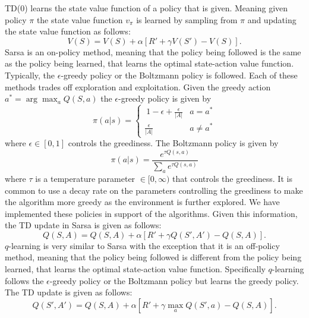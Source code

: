 \documentclass{article}
\begin{document}
TD(0) learns the state value function of a policy that is given. Meaning given policy $\pi$ the state value function $v_\pi$ is learned by sampling from $\pi$ and updating the state value function as follows:
\begin{equation}
V(S) = V(S) + \alpha [R' + \gamma V(S') - V(S)].
\end{equation}
Sarsa is an on-policy method, meaning that the policy being followed is the same as the policy being learned, that learns the optimal state-action value function. Typically, the $\epsilon$-greedy policy or the Boltzmann policy is followed. Each of these methods trades off exploration and exploitation. Given the greedy action $a^* = \arg \max_a Q(S, a)$ the $\epsilon$-greedy policy is given by
\begin{equation} \pi(a|s) =
\begin{cases}
\ 1 - \epsilon + \frac{\epsilon}{|A|} & a = a^* \\
\frac{\epsilon}{|A|} & a \neq a^*
\end{cases}
\end{equation}
where $\epsilon \in [0, 1]$ controls the greediness. The Boltzmann policy is given by
\begin{equation} \pi(a|s) =
\frac{e^{\tau Q(s, a)}}{\sum_a e^{\tau Q(s, a)}} 
\end{equation}
where $\tau$ is a temperature parameter $\in [0, \infty)$ that controls the greediness. It is common to use a decay rate on the parameters controlling the greediness to make the algorithm more greedy as the environment is further explored. We have implemented these policies in support of the algorithms. Given this information, the TD update in Sarsa is given as follows:
\begin{equation}
Q(S, A) = Q(S, A) + \alpha [R' + \gamma Q(S', A') - Q(S, A)].
\end{equation}
$q$-learning is very similar to Sarsa with the exception that it is an off-policy method, meaning that the policy being followed is different from the policy being learned, that learns the optimal state-action value function. Specifically $q$-learning follows the $\epsilon$-greedy policy or the Boltzmann policy but learns the greedy policy. The TD update is given as follows:
\begin{equation}
Q(S', A') = Q(S, A) + \alpha [R' + \gamma \max_a Q(S', a) - Q(S, A)].
\end{equation}
\end{document}
